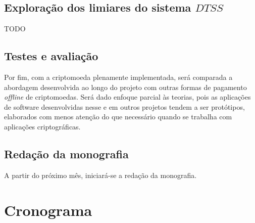 \documentclass[
  12pt,
  a4paper,
  oneside,
  article,
]{abntex2}
\begin{document}
\subsection{Exploração dos limiares do sistema $DTSS$}

TODO

\subsection{Testes e avaliação}

Por fim, com a criptomoeda plenamente implementada, será comparada a abordagem desenvolvida ao longo do projeto com outras formas de pagamento \textit{offline} de criptomoedas. Será dado enfoque parcial às teorias, pois as aplicações de software desenvolvidas nesse e em outros projetos tendem a ser protótipos, elaborados com menos atenção do que necessário quando se trabalha com aplicações criptográficas.

\subsection{Redação da monografia}

A partir do próximo mês, iniciará-se a redação da monografia.

\section{Cronograma}
\end{document}
